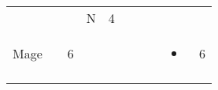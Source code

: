 \documentclass[12pt]{article}
\begin{document}
\begin{longtable}[]{@{}llllllllll@{}}
\begin{minipage}[t]{0.06\columnwidth}\raggedright\strut
\strut\end{minipage} &
\begin{minipage}[t]{0.06\columnwidth}\raggedright\strut
\strut\end{minipage} &
\begin{minipage}[t]{0.06\columnwidth}\raggedright\strut
\strut\end{minipage} &
\begin{minipage}[t]{0.07\columnwidth}\raggedright\strut
N
\strut\end{minipage} &
\begin{minipage}[t]{0.08\columnwidth}\raggedright\strut
4
\strut\end{minipage}\tabularnewline
\begin{minipage}[t]{0.13\columnwidth}\raggedright\strut
Mage
\strut\end{minipage} &
\begin{minipage}[t]{0.06\columnwidth}\raggedright\strut
\strut\end{minipage} &
\begin{minipage}[t]{0.06\columnwidth}\raggedright\strut
6
\strut\end{minipage} &
\begin{minipage}[t]{0.06\columnwidth}\raggedright\strut
\strut\end{minipage} &
\begin{minipage}[t]{0.06\columnwidth}\raggedright\strut
\strut\end{minipage} &
\begin{minipage}[t]{0.06\columnwidth}\raggedright\strut
\strut\end{minipage} &
\begin{minipage}[t]{0.06\columnwidth}\raggedright\strut
\strut\end{minipage} &
\begin{minipage}[t]{0.06\columnwidth}\raggedright\strut
\strut\end{minipage} &
\begin{minipage}[t]{0.07\columnwidth}\raggedright\strut
\begin{itemize}
\item
\end{itemize}
\strut\end{minipage} &
\begin{minipage}[t]{0.08\columnwidth}\raggedright\strut
6
\strut\end{minipage}\tabularnewline
\begin{minipage}[t]{0.13\columnwidth}\raggedright\strut

\end{minipage}
\end{longtable}
\end{document}
